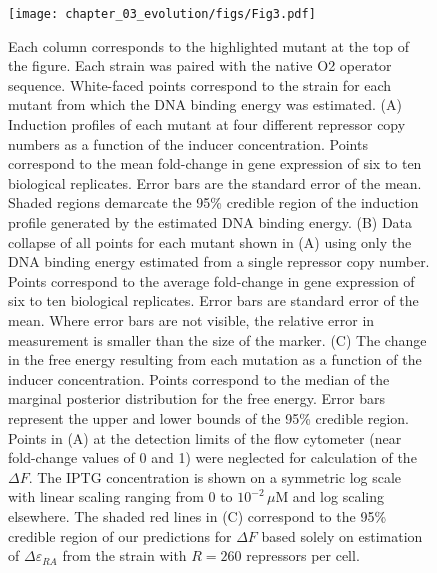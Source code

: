 \begin{figure}
\centering
\texttt{[image: chapter\_03\_evolution/figs/Fig3.pdf]}
\caption[Induction profiles and free energy differences of DNA binding
domain mutations.]{Each column corresponds to the highlighted mutant at the top of the
figure. Each strain was paired with the native O2 operator sequence. White-faced points correspond to the strain for each mutant
from which the DNA binding energy was estimated.  (A) Induction profiles of
each mutant at four different repressor copy numbers as a function of the
inducer concentration. Points correspond to the mean fold-change in gene
expression of six to ten biological replicates. Error bars are the standard
error of the mean. Shaded regions demarcate the 95\% credible region of the
induction profile generated by the estimated DNA binding energy. (B) Data
collapse of all points for each mutant shown in (A) using only the DNA
binding energy estimated from a single repressor copy number. Points
correspond to the average fold-change in gene expression of six to ten
biological replicates. Error bars are standard error of the mean. Where error
bars are not visible, the relative error in measurement is smaller than the
size of the marker. (C) The change in the free energy resulting from each
mutation as a function of the inducer concentration. Points correspond to the
median of the marginal posterior distribution for the free energy. Error bars
represent the upper and lower bounds of the 95\% credible region. Points in
(A) at the detection limits of the flow cytometer (near fold-change values of
0 and 1) were neglected for calculation of the $\Delta F$. The IPTG
concentration is shown on a symmetric log scale with linear scaling ranging from
$0$ to $10^{-2}\,\mu$M and log scaling elsewhere. The shaded red lines in (C) correspond to the 95\% credible region of
our predictions for $\Delta F$ based solely on estimation of
$\Delta\varepsilon_{RA}$ from the strain with $R=260$ repressors per cell.}
\label{fig:DNA_muts}
\end{figure}



